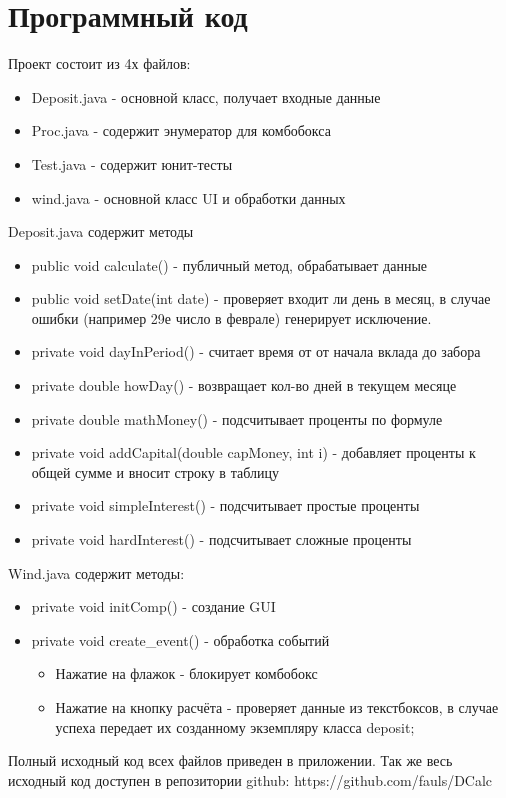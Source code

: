 \section{Программный код}
Проект состоит из 4х файлов:
\begin{itemize}
	\item Deposit.java - основной класс, получает входные данные
	\item Proc.java - содержит энумератор для комбобокса
	\item Test.java - содержит юнит-тесты
	\item wind.java - основной класс UI и обработки данных
\end{itemize}
Deposit.java содержит методы
\begin{itemize}
	\item public void calculate() - публичный метод, обрабатывает данные
	\item public void setDate(int date) - проверяет входит ли день в месяц, в случае ошибки (например 29е число в феврале) генерирует исключение.
	\item private void dayInPeriod() - считает время от от начала вклада до забора
	\item private double howDay() - возвращает кол-во дней в текущем месяце
	\item private double mathMoney() - подсчитывает проценты по формуле
	\item private void addCapital(double capMoney, int i) - добавляет проценты к общей сумме и вносит строку в таблицу
	\item private void simpleInterest() - подсчитывает простые проценты
	\item private void hardInterest() - подсчитывает сложные проценты
\end{itemize}
Wind.java содержит методы:
\begin{itemize}
	\item private void initComp() - создание GUI
	\item private void create\_event() - обработка событий
	\begin{itemize}
		\item Нажатие на флажок - блокирует комбобокс
		\item Нажатие на кнопку расчёта - проверяет данные из текстбоксов, в случае успеха передает их созданному экземпляру класса deposit;
	\end{itemize}
\end{itemize}
Полный исходный код всех файлов приведен в приложении.
Так же весь исходный код доступен в репозитории github:
https://github.com/fauls/DCalc

